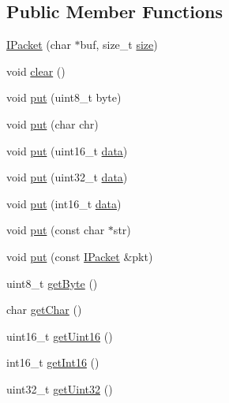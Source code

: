 \subsection*{Public Member Functions}
\begin{DoxyCompactItemize}
\item 
\hyperlink{classTiny_1_1IPacket_af44b18c4c8481475d40d8b87a6cb38ff}{I\+Packet} (char $\ast$buf, size\+\_\+t \hyperlink{classTiny_1_1IPacket_a76b6389f0d47b67c8428c58c2b09df51}{size})
\item 
void \hyperlink{classTiny_1_1IPacket_a6cc28c5235de6a9ce68bea546a4db17c}{clear} ()
\item 
void \hyperlink{classTiny_1_1IPacket_a9d5ba62a453b9cd364c0e214c245f11d}{put} (uint8\+\_\+t byte)
\item 
void \hyperlink{classTiny_1_1IPacket_a9dd0344bbed4500af63a3f700d31945b}{put} (char chr)
\item 
void \hyperlink{classTiny_1_1IPacket_a4dd6118251a5557691e4ed358a3b2ddc}{put} (uint16\+\_\+t \hyperlink{classTiny_1_1IPacket_aedf2ba31c5a29e3829458bd9f03a7051}{data})
\item 
void \hyperlink{classTiny_1_1IPacket_a5ec37c88a536d710fb1561cd62f52c91}{put} (uint32\+\_\+t \hyperlink{classTiny_1_1IPacket_aedf2ba31c5a29e3829458bd9f03a7051}{data})
\item 
void \hyperlink{classTiny_1_1IPacket_abf21aef6652da2e975c8be13e6a643e9}{put} (int16\+\_\+t \hyperlink{classTiny_1_1IPacket_aedf2ba31c5a29e3829458bd9f03a7051}{data})
\item 
void \hyperlink{classTiny_1_1IPacket_a46eaf3eb0232288dfb36ce7cc01b12e5}{put} (const char $\ast$str)
\item 
void \hyperlink{classTiny_1_1IPacket_a5ebc1e6507e7255a8babddbae82dcb2a}{put} (const \hyperlink{classTiny_1_1IPacket}{I\+Packet} \&pkt)
\item 
uint8\+\_\+t \hyperlink{classTiny_1_1IPacket_ac3088a86a37df4d08d0f6ca961abf006}{get\+Byte} ()
\item 
char \hyperlink{classTiny_1_1IPacket_a0fea05a806c533be32c68bb3899bd596}{get\+Char} ()
\item 
uint16\+\_\+t \hyperlink{classTiny_1_1IPacket_a345d5d5791d5929c9a5f9bb2763f99a5}{get\+Uint16} ()
\item 
int16\+\_\+t \hyperlink{classTiny_1_1IPacket_a9fd3b560b1f34e5d4c3e4a856bddc293}{get\+Int16} ()
\item 
uint32\+\_\+t \hyperlink{classTiny_1_1IPacket_a0a0d3758ca0f61e3eee9d20a7142de8d}{get\+Uint32} ()
\item 

\end{DoxyCompactItemize}
